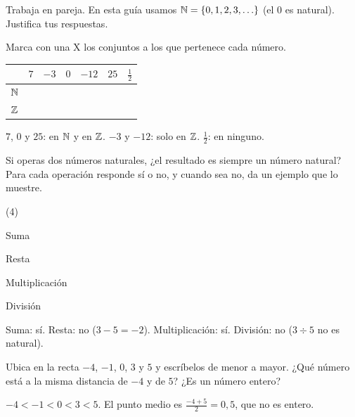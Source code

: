 \documentclass[11pt]{article}
\begin{document}
\encabezado

\begin{instrucciones}
Trabaja en pareja. En esta guía usamos $\mathbb{N} = \{0, 1, 2, 3, \ldots\}$ (el 0 es natural).
Justifica tus respuestas.
\end{instrucciones}

\begin{preguntas}

\pregunta[1] Marca con una X los conjuntos a los que pertenece cada número.
\begin{center}
{\renewcommand{\arraystretch}{1.6}
\begin{tabular}{|c|c|c|c|c|c|c|}
  \hline
  & $7$ & $-3$ & $0$ & $-12$ & $25$ & $\frac{1}{2}$\\\hline
  $\mathbb{N}$ & & & & & & \\\hline
  $\mathbb{Z}$ & & & & & & \\\hline
\end{tabular}}
\end{center}
\begin{solucion}
$7$, $0$ y $25$: en $\mathbb{N}$ y en $\mathbb{Z}$. $-3$ y $-12$: solo en $\mathbb{Z}$. $\frac{1}{2}$: en ninguno.
\end{solucion}

\pregunta[1] Si operas dos números naturales, ¿el resultado es siempre un número natural? Para
cada operación responde sí o no, y cuando sea no, da un ejemplo que lo muestre.
\begin{opciones*}(4)
  \item Suma
  \item Resta
  \item Multiplicación
  \item División
\end{opciones*}
\begin{solucion}[2.5cm]
Suma: sí. Resta: no ($3 - 5 = -2$). Multiplicación: sí. División: no ($3 \div 5$ no es natural).
\end{solucion}

\pregunta[1] Ubica en la recta $-4$, $-1$, $0$, $3$ y $5$ y escríbelos de menor a mayor.
¿Qué número está a la misma distancia de $-4$ y de $5$? ¿Es un número entero?
\begin{center}
\end{center}
\begin{solucion}[2cm]
$-4 < -1 < 0 < 3 < 5$. El punto medio es $\frac{-4 + 5}{2} = 0{,}5$, que no es entero.
\end{solucion}


\end{preguntas}
\end{document}
